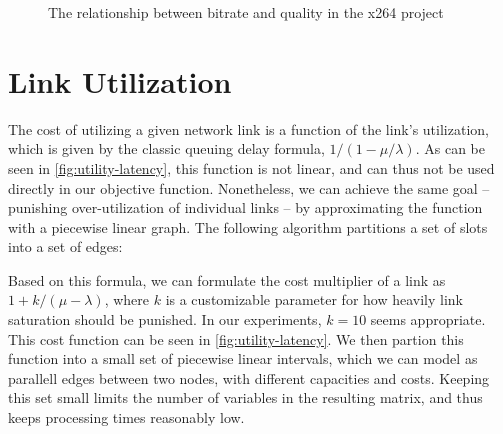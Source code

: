 \begin{figure}
    \centering


    \caption{The relationship between bitrate and quality in the x264 project}
    \label{fig:bitrate-quality}
\end{figure}


\section{Link Utilization}

The cost of utilizing a given network link is a function of the link's utilization, which is given by the classic queuing delay formula, $1/(1 - \mu/\lambda)$. As can be seen in \autoref{fig:utility-latency}, this function is not linear, and can thus not be used directly in our objective function. Nonetheless, we can achieve the same goal -- punishing over-utilization of individual links -- by approximating the function with a piecewise linear graph. The following algorithm partitions a set of slots into a set of edges:


Based on this formula, we can formulate the cost multiplier of a link as $1 + k/(\mu - \lambda)$, where $k$ is a customizable parameter for how heavily link saturation should be punished. In our experiments, $k=10$ seems appropriate. This cost function can be seen in \autoref{fig:utility-latency}. We then partion this function into a small set of piecewise linear intervals, which we can model as parallell edges between two nodes, with different capacities and costs. Keeping this set small limits the number of variables in the resulting matrix, and thus keeps processing times reasonably low.



